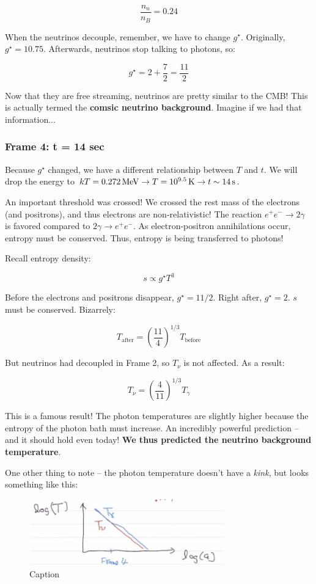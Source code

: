 \documentclass{article}
\newcommand{\unit}[1]{{\,\rm #1}}
\newcommand{\be}{\begin{equation}}
\newcommand{\ee}{\end{equation}}
\newcommand{\s}{\unit{s}}
\begin{document}
\be
\frac{n_n}{n_B} = 0.24
\ee

When the neutrinos decouple, remember, we have to change $g^\star$. Originally, $g^\star = 10.75$. Afterwards, neutrinos stop talking to photons, so:

\be
g^\star = 2 + \frac{7}{2} = \frac{11}{2}
\ee

Now that they are free streaming, neutrinos are pretty similar to the CMB! This is actually termed the \textbf{comsic neutrino background}. Imagine if we had that information...


\subsubsection{Frame 4: t = 14 sec}

Because $g^\star$ changed, we have a different relationship between $T$ and $t$. We will drop the energy to $kT = 0.272 \unit{ MeV} \rightarrow T = 10^{9.5} \unit{ K} \rightarrow t \sim 14 \s$. 

An important threshold was crossed! We crossed the rest mass of the electrons (and positrons), and thus electrons are non-relativistic! The reaction $e^+e^- \rightarrow 2\gamma$ is favored compared to $2\gamma \rightarrow e^+e^-$. As electron-positron annihilations occur, entropy must be conserved. Thus, entropy is being transferred to photons! 

Recall entropy density:

\be
s \propto g^\star T^3
\ee

Before the electrons and positrons disappear, $g^\star = 11/2$. Right after, $g^\star = 2$. $s$ must be conserved. Bizarrely:

\be
T_\text{after} = \left(\frac{11}{4}\right)^{1/3} T_\text{before}
\ee

But neutrinos had decoupled in Frame 2, so $T_\nu$ is not affected. As a result:

\be
T_\nu = \left(\frac{4}{11}\right)^{1/3} T_\gamma
\ee

This is a famous result! The photon temperatures are slightly higher because the entropy of the photon bath must increase. An incredibly powerful prediction -- and it should hold even today! \textbf{We thus predicted the neutrino background temperature}. 

One other thing to note -- the photon temperature doesn't have a \textit{kink}, but looks something like this:

\begin{figure}[h]
    \centering
    \includegraphics[width=0.75\textwidth]{entropy_transfer.png}
    \caption{Caption}
    \label{fig:entropy_transfer}
\end{figure}
\end{document}
